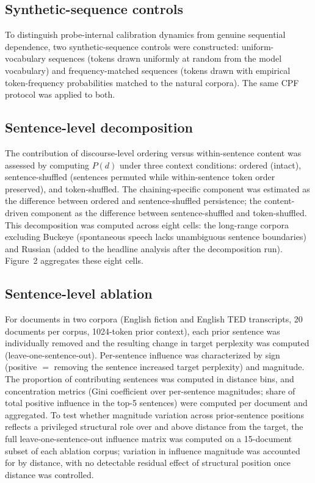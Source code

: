 \documentclass[11pt]{article}
\begin{document}
\subsection{Synthetic-sequence controls}

To distinguish probe-internal calibration dynamics from genuine sequential dependence, two
synthetic-sequence controls were constructed: uniform-vocabulary sequences (tokens drawn uniformly
at random from the model vocabulary) and frequency-matched sequences (tokens drawn with empirical
token-frequency probabilities matched to the natural corpora). The same CPF
protocol was applied to both.

\subsection{Sentence-level decomposition}

The contribution of discourse-level ordering versus within-sentence content was assessed by
computing $P(d)$ under three context conditions: ordered (intact), sentence-shuffled (sentences
permuted while within-sentence token order preserved), and token-shuffled. The chaining-specific
component was estimated as the difference between ordered and sentence-shuffled persistence; the
content-driven component as the difference between sentence-shuffled and token-shuffled. This
decomposition was computed across eight cells: the long-range corpora excluding Buckeye (spontaneous
speech lacks unambiguous sentence boundaries) and Russian (added to the headline analysis after the
decomposition run). Figure~2 aggregates these eight cells.

\subsection{Sentence-level ablation}

For documents in two corpora (English fiction and English TED transcripts, 20 documents per corpus,
1024-token prior context), each prior sentence was individually removed and the resulting change in
target perplexity was computed (leave-one-sentence-out). Per-sentence influence was characterized by
sign (positive $=$ removing the sentence increased target perplexity) and magnitude. The proportion
of contributing sentences was computed in distance bins, and concentration metrics (Gini coefficient
over per-sentence magnitudes; share of total positive influence in the top-5 sentences) were computed
per document and aggregated. To test whether magnitude variation across prior-sentence positions
reflects a privileged structural role over and above distance from the target, the full
leave-one-sentence-out influence matrix was computed on a 15-document subset of each ablation corpus;
variation in influence magnitude was accounted for by distance, with no detectable residual effect of
structural position once distance was controlled.
\end{document}
